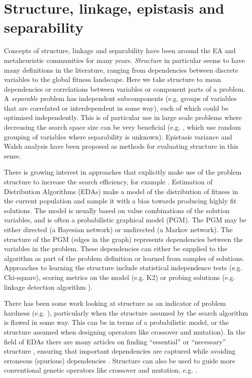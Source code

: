\documentclass[a4paper]{article}
\begin{document}
\section{Structure, linkage, epistasis and separability}


Concepts of structure, linkage and separability have been around the EA and metaheuristic communities for many years.
\emph{Structure} in particular seems to have many definitions in the literature, ranging from dependencies between discrete variables to the global fitness landscape.
Here we take structure to mean dependencies or correlations between variables or component parts of a problem.
A \emph{separable} problem has independent subcomponents (e.g. groups of variables that are correlated or interdependent in some way), each of which could be optimised independently.
This is of particular use in large scale problems where decreasing the search space size can be very beneficial (e.g. \cite{Yang2008,Omidvar2010}, which use random grouping of variables where separability is unknown).
Epistasis variance \cite{Davidor1991} and Walsh analysis \cite{Bethke1980,Goldberg1989a,Goldberg1989b} have been proposed as methods for evaluating structure in this sense.

There is growing interest in approaches that explicitly make use of the problem structure to increase the search efficiency, for example \cite{Chicano2014,Whitley2012}.
Estimation of Distribution Algorithms (EDAs) \cite{Larranaga2002,Lozano2006,Hauschild2011a} make a model of the distribution of fitness in the current population and sample it with a bias towards producing highly fit solutions.
The model is usually based on value combinations of the solution variables, and is often a probabilistic graphical model (PGM).
The PGM may be either directed (a Bayesian network) or undirected (a Markov network).
The structure of the PGM (edges in the graph) represents dependencies between the variables in the problem.
These dependencies can either be supplied to the algorithm as part of the problem definition or learned from samples of solutions.
Approaches to learning the structure include statistical independence tests (e.g. Chi-square), scoring metrics on the model (e.g. K2) or probing solutions (e.g. linkage detection algorithm \cite{Heckendorn2004}).

There has been some work looking at structure as an indicator of problem hardness (e.g. \cite{Echegoyen2013}), particularly when the structure assumed by the search algorithm is flawed in some way.
This can be in terms of a probabilistic model, or the structure assumed when designing operators like crossover and mutation).
In the field of EDAs there are many articles on finding ``essential'' or ``necessary'' structure \cite{Santana2009, Hauschild2009, Echegoyen2007, Kallel_et_al:2000, Muhlenbein2000, Santana2009a,Santana2005,Lima2010,Radetic2010,Pelikan2002a}, ensuring that important dependencies are captured while avoiding erroneous (spurious) dependencies \cite{Muhlenbein2000,Thierens2011,Christie2014,Brownlee2015}.
Structure can also be used to guide more conventional genetic operators like crossover and mutation, e.g. \cite{Zhang2007}.
\end{document}
